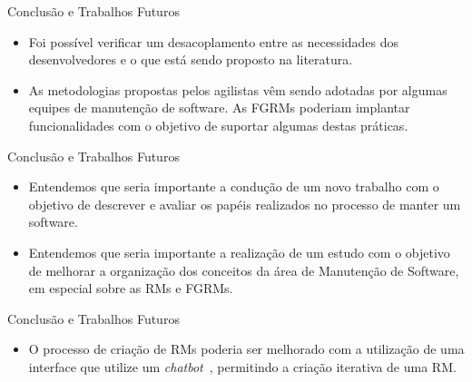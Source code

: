 \documentclass[t,14pt,mathserif]{beamer}
\begin{document}
\begin{frame}{Conclusão e Trabalhos Futuros}
    \begin{itemize}

        \item Foi possível verificar um desacoplamento entre as necessidades
            dos desenvolvedores e o que está sendo proposto na literatura.

        \item  As metodologias propostas pelos agilistas vêm sendo adotadas por
            algumas equipes de manutenção de software. As FGRMs poderiam
            implantar funcionalidades com o objetivo de suportar algumas destas
            práticas.

    \end{itemize}
\end{frame}

\begin{frame}{Conclusão e Trabalhos Futuros}
    \begin{itemize}
        \item Entendemos que seria importante a condução de um novo trabalho com
            o objetivo de descrever e avaliar os papéis realizados no processo
            de manter um software.

        \item Entendemos que seria importante a realização de um estudo com o
            objetivo de melhorar a organização dos conceitos da área de
            Manutenção de Software, em especial sobre as RMs e FGRMs.

    \end{itemize}
\end{frame}

\begin{frame}{Conclusão e Trabalhos Futuros}
    \begin{itemize}

        \item O processo de criação de RMs poderia ser melhorado com a
            utilização de uma interface que utilize um
            \textit{chatbot}~\cite{mauldin1994chatterbots,huang2007extracting},
            permitindo a criação iterativa de uma RM\@.

    \end{itemize}
\end{frame}
\end{document}
